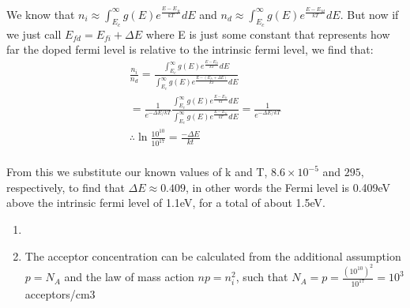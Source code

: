 \documentclass{article}
\begin{document}
\begin{prob}
	We know that $n_i\approx\int_{E_c}^{\infty}g(E)e^{\frac{E-E_{fi}}{kT}}dE$ and $n_d\approx\int_{E_c}^{\infty}g(E)e^{\frac{E-E_{fd}}{kT}}dE$. But now if we just call $E_{fd}=E_{fi}+\Delta E$ where E is just some constant that represents how far the doped fermi level is relative to the intrinsic fermi level, we find that:  
	\[\begin{split} 
		\frac{n_i}{n_d}=\frac{\int_{E_c}^{\infty}g(E)e^{\frac{E-E_{fi}}{kT}}dE}{\int_{E_c}^{\infty}g(E)e^{\frac{E-(E_{fi}+\Delta E)}{kT}}dE} \\
    =\frac{1}{e^{- \Delta E/kT}}\frac{\int_{E_c}^{\infty}g(E)e^{\frac{E-E_{fi}}{kT}}dE}{\int_{E_c}^{\infty}g(E)e^{\frac{E-E_{fi}}{kT}}dE}=\frac{1}{e^{-\Delta E/kT}} \\
 \therefore \ln{\frac{10^{10}}{10^{17}}} = \frac{-\Delta E}{kt} \\
	\end{split} 
 \]
 \end{prob}

From this we substitute our known values of k and T, $8.6\times10^{-5}$ and $295$, respectively, to find that $\Delta E\approx0.409$, in other words the Fermi level is 0.409eV above the intrinsic fermi level of 1.1eV, for a total of about 1.5eV. 

\begin{prob}
    \begin{enumerate}
        \item {}

        \item The acceptor concentration can be calculated from the additional assumption $p=N_A$ and the law of mass action $np=n_i^2$, such that $N_A=p=\frac{(10^{10})^2}{10^{17}}=10^3$ acceptors/cm3
    \end{enumerate}
\end{prob}
\end{document}
